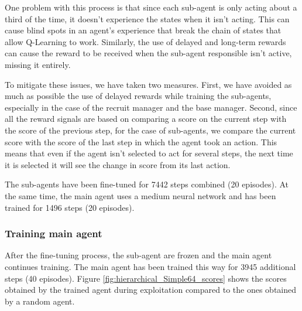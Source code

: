 One problem with this process is that since each sub-agent is only acting about a third of the time, it doesn't experience the states when it isn't acting. This can cause blind spots in an agent's experience that break the chain of states that allow Q-Learning to work. Similarly, the use of delayed and long-term rewards can cause the reward to be received when the sub-agent responsible isn't active, missing it entirely.

To mitigate these issues, we have taken two measures. First, we have avoided as much as possible the use of delayed rewards while training the sub-agents, especially in the case of the recruit manager and the base manager. Second, since all the reward signals are based on comparing a score on the current step with the score of the previous step, for the case of sub-agents, we compare the current score with the score of the last step in which the agent took an action. This means that even if the agent isn't selected to act for several steps, the next time it is selected it will see the change in score from its last action.

The sub-agents have been fine-tuned for 7442 steps combined (20 episodes). At the same time, the main agent uses a medium neural network and has been trained for 1496 steps (20 episodes).

\subsubsection*{Training main agent}

After the fine-tuning process, the sub-agent are frozen and the main agent continues training. The main agent has been trained this way for 3945 additional steps (40 episodes). Figure \ref{fig:hierarchical_Simple64_scores} shows the scores obtained by the trained agent during exploitation compared to the ones obtained by a random agent.

